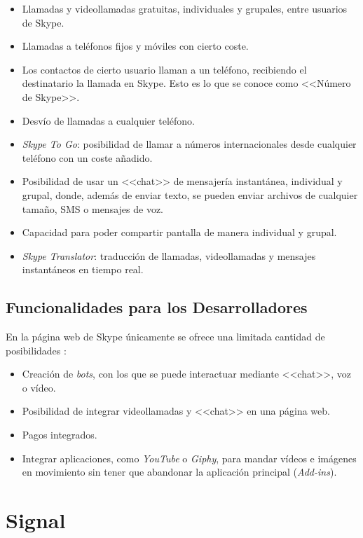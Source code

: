 \begin{itemize}
	\item Llamadas y videollamadas gratuitas, individuales y grupales, entre usuarios de Skype.
	\item Llamadas a teléfonos fijos y móviles con cierto coste.
	\item Los contactos de cierto usuario llaman a un teléfono, recibiendo el destinatario la llamada en Skype. Esto es lo que se conoce como <<Número de Skype>>.
	\item Desvío de llamadas a cualquier teléfono.
	\item \textit{Skype To Go}: posibilidad de llamar a números internacionales desde cualquier teléfono con un coste añadido.
	\item Posibilidad de usar un <<chat>> de mensajería instantánea, individual y grupal, donde, además de enviar texto, se pueden enviar archivos de cualquier tamaño, \acf{SMS} o mensajes de voz.
	\item Capacidad para poder compartir pantalla de manera individual y grupal.
	\item \textit{Skype Translator}: traducción de llamadas, videollamadas y mensajes instantáneos en tiempo real.
\end{itemize}

\newpage

\subsection{Funcionalidades para los Desarrolladores}
En la página web de Skype únicamente se ofrece una limitada cantidad de posibilidades \cite{Skype2017a}:

\begin{itemize}
	\item Creación de \textit{bots}, con los que se puede interactuar mediante <<chat>>, voz o vídeo.
	\item Posibilidad de integrar videollamadas y <<chat>> en una página web.
	\item Pagos integrados.
	\item Integrar aplicaciones, como \textit{YouTube} o \textit{Giphy}, para mandar vídeos e imágenes en movimiento sin tener que abandonar la aplicación principal (\textit{Add-ins}).
\end{itemize}

\section{Signal}
\label{sec:signal}

